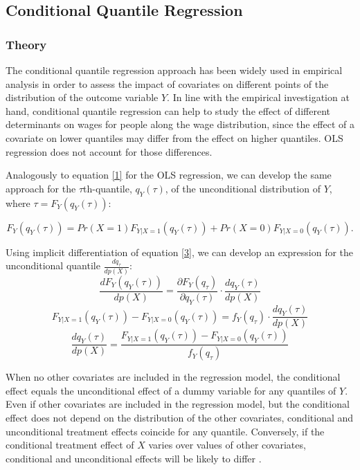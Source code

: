 \subsection{Conditional Quantile Regression}\label{SubSec:CQR}

\subsubsection{Theory}
The conditional quantile regression approach has been widely used in empirical analysis in order to assess the impact of covariates on different points of the distribution of the outcome variable $Y$. In line with the empirical investigation at hand, conditional quantile regression can help to study the effect of different determinants on wages for people along the wage distribution, since the effect of a covariate on lower quantiles may differ from the effect on higher quantiles. OLS regression does not account for those differences.

Analogously to equation \ref{1} for the OLS regression, we can develop the same approach for the $\tau$th-quantile, $q_{Y}(\tau)$, of the unconditional distribution of $Y$, where $\tau=F_{Y}(q_{Y}(\tau))$:

\begin{equation}\label{3}
  F_{Y}(q_{Y}(\tau))=Pr(X=1)F_{Y|X=1}(q_{Y}(\tau))+Pr(X=0)F_{Y|X=0}(q_{Y}(\tau)).
\end{equation}

Using implicit differentiation of equation \ref{3}, we can develop an expression for the unconditional quantile $\frac{dq_{\tau}}{dp(X)}$:
\begin{equation*}
  \frac{dF_{Y}(q_{Y}(\tau))}{dp(X)}=\frac{\partial F_{Y}(q_{\tau})}{\partial q_{Y}(\tau)}\cdot \frac{dq_{Y}(\tau)}{dp(X)}
\end{equation*}
\begin{equation*}
  F_{Y|X=1}(q_{Y}(\tau))-F_{Y|X=0}(q_{Y}(\tau))=f_{Y}(q_{\tau})\cdot \frac{dq_{Y}(\tau)}{dp(X)}
\end{equation*}
\begin{equation}\label{4}
  \frac{dq_{Y}(\tau)}{dp(X)}=\frac{F_{Y|X=1}(q_{Y}(\tau))-F_{Y|X=0}(q_{Y}(\tau))}{f_{Y}(q_{\tau})}
\end{equation}

When no other covariates are included in the regression model, the conditional effect equals the unconditional effect of a dummy variable for any quantiles of $Y$. Even if other covariates are included in the regression model, but the conditional effect does not depend on the distribution of the other covariates, conditional and unconditional treatment effects coincide for any quantile. Conversely, if the conditional treatment effect of $X$ varies over values of other covariates, conditional and unconditional effects will be likely to differ \citep{Borah&Basu:2013}.

